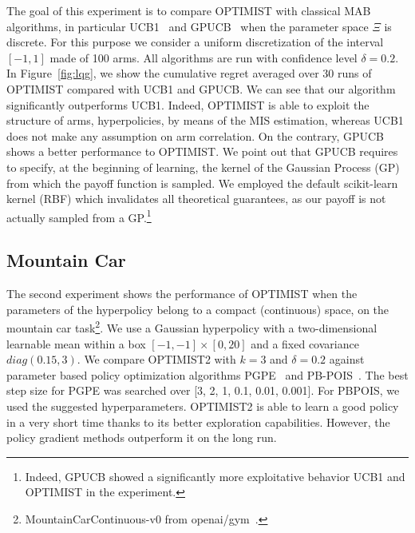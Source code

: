 \documentclass{article}
\makeatletter
\DeclareRobustCommand{\algoname}{OPTIMIST\@\xspace}
\makeatother
\begin{document}
The goal of this experiment is to compare \algoname
with classical MAB algorithms, in particular UCB1~\cite{auer2002finite} and GPUCB~\cite{srinivas2010gaussian} when the parameter space $\Xi$ is discrete. For this purpose we consider a uniform discretization of the interval $[-1,1]$ made of 100 arms. All algorithms are run with confidence level $\delta=0.2$.
In Figure~\ref{fig:lqg}, we show the cumulative regret averaged over 30 runs of \algoname compared with UCB1 and GPUCB. We can see that our algorithm significantly outperforms UCB1. Indeed, \algoname is
able to exploit the structure of arms, \ie hyperpolicies, by means of the MIS estimation, whereas UCB1 does not make any assumption on arm correlation. On the contrary, GPUCB shows a better performance \wrt to \algoname. We point out that GPUCB requires to specify, at the beginning of learning, the kernel of the Gaussian Process (GP) from which the payoff function is sampled. We employed the default scikit-learn kernel (RBF) which invalidates all theoretical guarantees, as our payoff is not actually sampled from a GP.\footnote{Indeed, GPUCB showed a significantly more exploitative behavior \wrt UCB1 and \algoname in the experiment.}

\subsection{Mountain Car}
The second experiment shows the performance of \algoname  
when the parameters of the hyperpolicy belong to a compact (continuous) space, on the mountain car task\footnote{MountainCarContinuous-v0 from openai/gym~\citep{brockman2016openai}.}. We use a Gaussian hyperpolicy with a two-dimensional learnable mean within a box $[-1,-1]\times[0,20]$ and a fixed covariance $diag(0.15,3)$. We compare OPTIMIST2 with $k=3$ and $\delta=0.2$ against parameter based policy optimization algorithms PGPE~\citep{sehnke2008policy} and PB-POIS~\cite{metelli2018policy}. The best step size for PGPE was searched over [3, 2, 1, 0.1, 0.01, 0.001]. For PBPOIS, we used the suggested hyperparameters. OPTIMIST2 is able to learn a good policy in a very short time thanks to its better exploration capabilities. However, the policy gradient methods outperform it on the long run.
\end{document}

